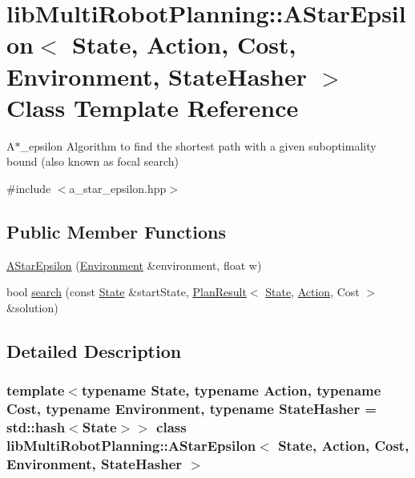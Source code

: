 \hypertarget{classlib_multi_robot_planning_1_1_a_star_epsilon}{}\section{lib\+Multi\+Robot\+Planning\+:\+:A\+Star\+Epsilon$<$ State, Action, Cost, Environment, State\+Hasher $>$ Class Template Reference}
\label{classlib_multi_robot_planning_1_1_a_star_epsilon}


A$\ast$\+\_\+epsilon Algorithm to find the shortest path with a given suboptimality bound (also known as focal search)  




{\ttfamily \#include $<$a\+\_\+star\+\_\+epsilon.\+hpp$>$}

\subsection*{Public Member Functions}
\begin{DoxyCompactItemize}
\item 
\hyperlink{classlib_multi_robot_planning_1_1_a_star_epsilon_a553d070b869a0d33dbbea6f0e95fee1a}{A\+Star\+Epsilon} (\hyperlink{classlib_multi_robot_planning_1_1_environment}{Environment} \&environment, float w)
\item 
bool \hyperlink{classlib_multi_robot_planning_1_1_a_star_epsilon_a24eddac1c20a92f7a58d4865b13a0186}{search} (const \hyperlink{structlib_multi_robot_planning_1_1_state}{State} \&start\+State, \hyperlink{structlib_multi_robot_planning_1_1_plan_result}{Plan\+Result}$<$ \hyperlink{structlib_multi_robot_planning_1_1_state}{State}, \hyperlink{namespacelib_multi_robot_planning_aba73fb71693f86a324adfa0e41e1053d}{Action}, Cost $>$ \&solution)
\end{DoxyCompactItemize}


\subsection{Detailed Description}
\subsubsection*{template$<$typename State, typename Action, typename Cost, typename Environment, typename State\+Hasher = std\+::hash$<$\+State$>$$>$\newline
class lib\+Multi\+Robot\+Planning\+::\+A\+Star\+Epsilon$<$ State, Action, Cost, Environment, State\+Hasher $>$}

